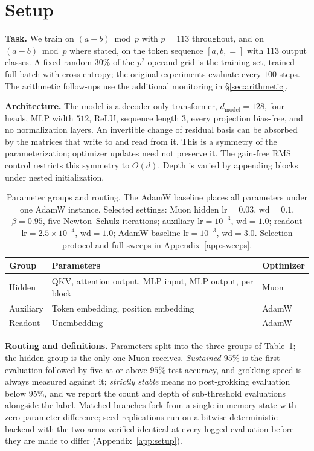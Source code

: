 \documentclass{article}
\begin{document}
\section{Setup}
\label{sec:setup}

\textbf{Task.} We train on $(a+b)\bmod p$ with $p=113$ throughout, and on $(a-b)\bmod p$ where stated, on the token sequence $[a,b,=]$ with $113$ output classes. A fixed random $30\%$ of the $p^2$ operand grid is the training set, trained full batch with cross-entropy; the original experiments evaluate every $100$ steps. The arithmetic follow-ups use the additional monitoring in \S\ref{sec:arithmetic}.

\textbf{Architecture.} The model is a decoder-only transformer, $d_{\text{model}}=128$, four heads, MLP width $512$, ReLU, sequence length $3$, every projection bias-free, and no normalization layers. An invertible change of residual basis can be absorbed by the matrices that write to and read from it. This is a symmetry of the parameterization; optimizer updates need not preserve it. The gain-free RMS control restricts this symmetry to $O(d)$. Depth is varied by appending blocks under nested initialization.

\begin{table}[t]
\centering
\small
\caption{Parameter groups and routing. The AdamW baseline places all parameters under one AdamW instance. Selected settings: Muon hidden $\mathrm{lr}=0.03$, $\mathrm{wd}=0.1$, $\beta=0.95$, five Newton--Schulz iterations; auxiliary $\mathrm{lr}=10^{-3}$, $\mathrm{wd}=1.0$; readout $\mathrm{lr}=2.5\times10^{-4}$, $\mathrm{wd}=1.0$; AdamW baseline $\mathrm{lr}=10^{-3}$, $\mathrm{wd}=3.0$. Selection protocol and full sweeps in Appendix~\ref{app:sweeps}.}
\label{tab:routing}
\begin{tabular}{lll}
\toprule
Group & Parameters & Optimizer \\
\midrule
Hidden & QKV, attention output, MLP input, MLP output, per block & Muon \\
Auxiliary & Token embedding, position embedding & AdamW \\
Readout & Unembedding & AdamW \\
\bottomrule
\end{tabular}
\end{table}

\textbf{Routing and definitions.} Parameters split into the three groups of Table~\ref{tab:routing}; the hidden group is the only one Muon receives. \emph{Sustained $95\%$} is the first evaluation followed by five at or above $95\%$ test accuracy, and grokking speed is always measured against it; \emph{strictly stable} means no post-grokking evaluation below $95\%$, and we report the count and depth of sub-threshold evaluations alongside the label. Matched branches fork from a single in-memory state with zero parameter difference; seed replications run on a bitwise-deterministic backend with the two arms verified identical at every logged evaluation before they are made to differ (Appendix~\ref{app:setup}).
\end{document}
